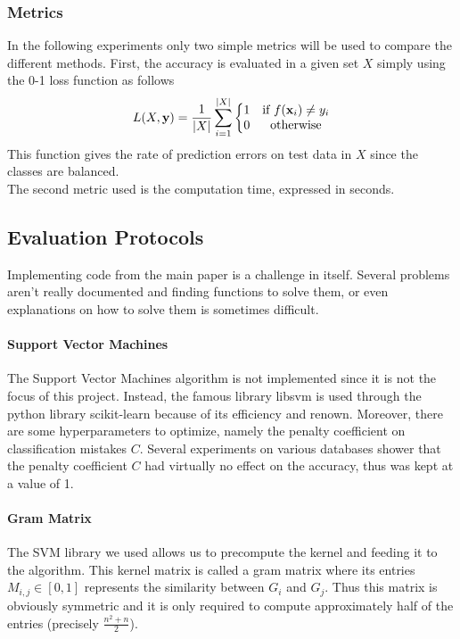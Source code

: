 \documentclass{article}
\DeclarePairedDelimiter{\abs}{\lvert}{\rvert}
\let\vec\mathbf
\theoremstyle{definition}
\begin{document}
\subsubsection{Metrics}
In the following experiments only two simple metrics will be used to compare the different methods. First, the accuracy is evaluated in a given set $X$ simply using the 0-1 loss function as follows
\begin{equation}
L(X,\vec{y})=\frac{1}{\abs{X}}\sum\limits_{i=1}^{\abs{X}}\left\{
\begin{matrix}
1 & \mbox{if } f(\vec{x}_i) \neq y_i \\
0 & \mbox{otherwise}
\end{matrix}
\right.
\end{equation}
This function gives the rate of prediction errors on test data in $X$ since the classes are balanced.\\
The second metric used is the computation time, expressed in seconds. 
\subsection{Evaluation Protocols}
Implementing code from the main paper is a challenge in itself. Several problems aren't really documented and finding functions to solve them, or even explanations on how to solve them is sometimes difficult.
\paragraph{Support Vector Machines}
The Support Vector Machines algorithm is not implemented since it is not the focus of this project. Instead, the famous library libsvm\cite{cc2011libsvm} is used through the python library scikit-learn\cite{pedregosa2011scikit} because of its efficiency and renown. Moreover, there are some hyperparameters to optimize, namely the penalty coefficient on classification mistakes $C$. Several experiments on various databases shower that the penalty coefficient $C$ had virtually no effect on the accuracy, thus was kept at a value of 1.
\paragraph{Gram Matrix}
The SVM library we used allows us to precompute the kernel and feeding it to the algorithm. This kernel matrix is called a gram matrix where its entries $M_{i,j}\in [0,1]$ represents the similarity between $G_i$ and $G_j$. Thus this matrix is obviously symmetric and it is only required to compute approximately half of the entries (precisely $\frac{n^2+n}{2}$).
\end{document}
